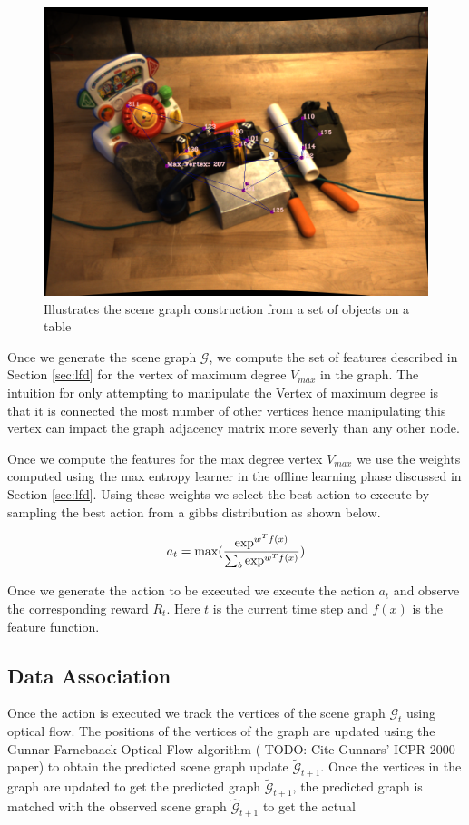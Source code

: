 \begin{figure}[ht!]
	\centering
	\includegraphics[width=\linewidth]{figs/full_graph.png}
	\caption{Illustrates the scene graph construction from a set of objects on a table}
	\label{fig:scene_graph}
\end{figure}

Once we generate the scene graph $\mathcal{G}$, we compute the set of features described in Section \ref{sec:lfd} for the vertex of maximum degree $V_{max}$ in the graph. The intuition for only attempting to manipulate the Vertex of maximum degree is that it is connected the most number of other vertices hence manipulating this vertex can impact the graph adjacency matrix more severly than any other node.

Once we compute the features for the max degree vertex $V_{max}$ we use the weights computed using the max entropy learner in the offline learning phase discussed in Section \ref{sec:lfd}. Using these weights we select the best action to execute by sampling the best action from a gibbs distribution as shown below.

\[
a_t = \max(\frac{\exp^{w^Tf(x)}}{ \sum_b\exp^{w^Tf(x)}})\\
\]

Once we generate the action to be executed we execute the action $a_t$ and observe the corresponding reward $R_t$. Here $t$ is the current time step and $f(x)$ is the feature function.

\subsection{Data Association}
Once the action is executed we track the vertices of the scene graph $\mathcal{G}_t$ using optical flow. The positions of the vertices of the graph are updated using the Gunnar Farnebaack Optical Flow algorithm (\cite{Javidi12_Journal} TODO: Cite Gunnars' ICPR 2000 paper) to obtain the predicted scene graph update $\tilde{\mathcal{G}}_{t+1}$. Once the vertices in the graph are updated to get the predicted graph $\tilde{\mathcal{G}}_{t+1}$, the predicted graph is matched with the observed scene graph $\hat{\mathcal{G}}_{t+1}$ to get the actual

